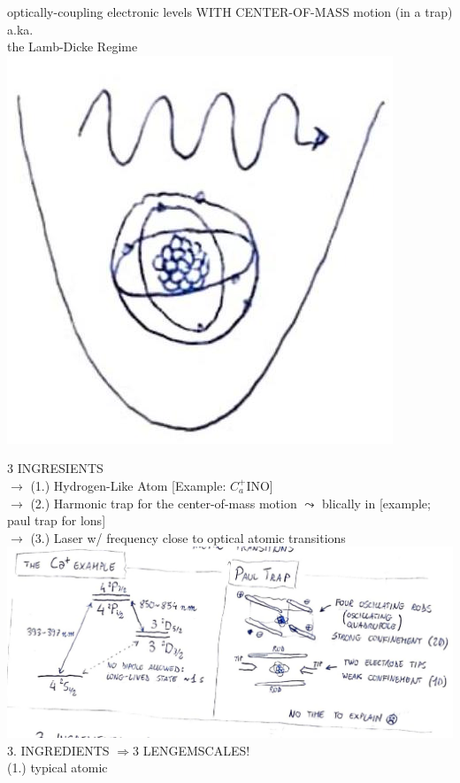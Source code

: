 \documentclass[10pt]{article}
\begin{document}
\captionsetup{singlelinecheck=false}
optically-coupling electronic levels WITH CENTER-OF-MASS motion (in a trap) a.ka.\\
the Lamb-Dicke Regime\\
\includegraphics[max width=\textwidth, center]{2025_10_16_9146de9f5ba4f09535e7g-1}

3 INGRESIENTS\\
$\rightarrow$ (1.) Hydrogen-Like Atom [Example: $C_{a}^{+}$INO]\\
$\rightarrow$ (2.) Harmonic trap for the center-of-mass motion $\leadsto$ blically in [example; paul trap for lons]\\
$\rightarrow$ (3.) Laser w/ frequency close to optical atomic transitions\\
\includegraphics[max width=\textwidth, center]{2025_10_16_9146de9f5ba4f09535e7g-1(1)}\\
3. INGREDIENTS $\Rightarrow 3$ LENGEMSCALES!\\
(1.) typical atomic
\end{document}
